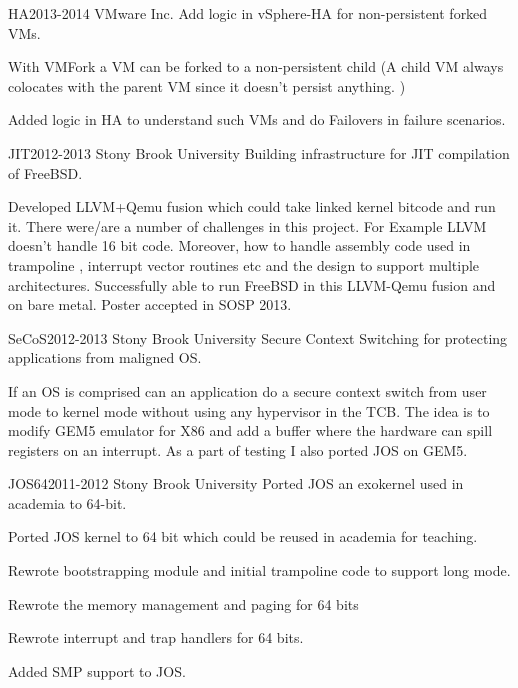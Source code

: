 \documentclass[10pt]{article} %
\begin{document}
\project
{HA}{2013-2014}
{VMware Inc.}
{Add logic in vSphere-HA for non-persistent forked VMs.}
{\begin{itemize-noindent}
\item{With VMFork a VM can be forked to a non-persistent child (A child VM always colocates with the parent VM since it doesn't
persist anything. )}
\item{Added logic in HA to understand such VMs and do Failovers in failure scenarios.}
\end{itemize-noindent}}

\project
{JIT}{2012-2013}
{Stony Brook University}
{Building infrastructure for JIT compilation of FreeBSD.}
{\begin{itemize-noindent}
\item{Developed LLVM+Qemu fusion which could take linked kernel bitcode and run it. There were/are a number of challenges in this project. For Example LLVM doesn’t handle 16 bit code. Moreover, how to handle assembly code used in trampoline , interrupt vector routines etc and the design to support multiple architectures. Successfully able to run FreeBSD in this LLVM-Qemu fusion and on bare metal. Poster accepted in SOSP 2013.}
\end{itemize-noindent}}

\project
{SeCoS}{2012-2013}
{Stony Brook University}
{Secure Context Switching for protecting applications from maligned OS.}
{\begin{itemize-noindent}
\item{If an OS is comprised can an application do a secure context switch from user mode to kernel mode without using any hypervisor in the TCB. The idea is to modify GEM5 emulator for X86 and add a buffer where the hardware can spill registers on an interrupt. As a part of testing I also ported JOS on GEM5.}
\end{itemize-noindent}}

\project
{JOS64}{2011-2012}
{Stony Brook University}
{Ported JOS an exokernel used in academia to 64-bit.}
{\begin{itemize-noindent}
\item{Ported JOS kernel to 64 bit which could be reused in academia for teaching.}
\item{Rewrote bootstrapping module and initial trampoline code to support long mode.}
\item{Rewrote the memory management and paging for 64 bits}
\item{Rewrote interrupt and trap handlers for 64 bits.}
\item{Added SMP support to JOS.}
\end{itemize-noindent}}
\end{document}
